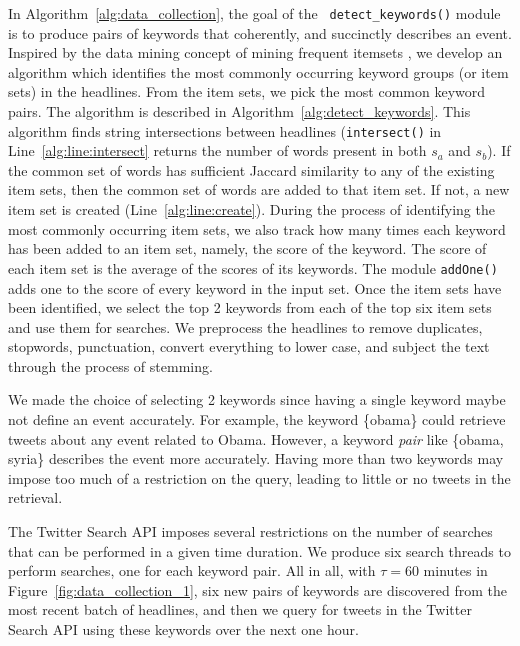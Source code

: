 \documentclass[10pt,letterpaper]{article}
\begin{document}
In Algorithm~\ref{alg:data_collection}, the goal of the {\tt
  detect\_keywords()} module is to produce pairs of keywords that
coherently, and succinctly describes an event. Inspired by the data
mining concept of mining frequent itemsets \cite{Tan_Steinbach_Kumar},
we develop an algorithm which identifies the most commonly occurring
keyword groups (or item sets) in the headlines. From the item sets, we
pick the most common keyword pairs. The algorithm is described in
Algorithm~\ref{alg:detect_keywords}. This algorithm finds string
intersections between headlines ({\tt intersect()} in
Line~\ref{alg:line:intersect} returns the number of words present in
both $s_a$ and $s_b$). If the common set of words has sufficient
Jaccard similarity to any of the existing item sets, then the common
set of words are added to that item set. If not, a new item set is
created (Line~\ref{alg:line:create}). During the process of
identifying the most commonly occurring item sets, we also track how
many times each keyword has been added to an item set, namely, the
score of the keyword. The score of each item set is the average of the
scores of its
keywords. The module \texttt{addOne()} adds one to the score
of every keyword in the input set.%
Once the item sets have been identified, we select the top 2 keywords
from each of the top six item sets and use them for searches. We
preprocess the headlines to remove duplicates, stopwords, punctuation,
convert everything to lower case, and subject the text through the
process of stemming.

We made the choice of selecting 2 keywords since having a single
keyword maybe not define an event accurately. For example, the keyword
\{obama\} could retrieve tweets about any event related to Obama.
However, a keyword \emph{pair} like \{obama, syria\} describes the
event more accurately.  Having more than two keywords may impose
too much of a restriction on the query, leading to little
or no tweets in the retrieval.

The Twitter Search API imposes several restrictions on the number of
searches that can be performed in a given time duration.
We produce six search threads to perform searches, one for each
keyword pair. All in all, with $\tau = 60$ minutes in
Figure~\ref{fig:data_collection_1}, six new pairs of keywords are
discovered from the most recent batch of headlines, and then we query
for tweets in the Twitter Search API using these keywords over the
next one hour.
\end{document}
